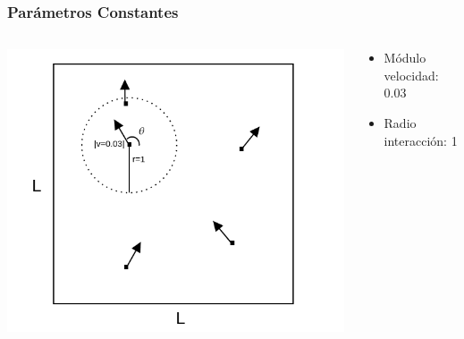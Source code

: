 \begin{frame}
\frametitle{Parámetros Constantes}
\begin{columns}
    \begin{column}{0.4\textwidth}
      \begin{center}
        \includegraphics[width=\textwidth]{images/model-values.png} %
      \end{center}
    \end{column}
    \begin{column}{0.6\textwidth}
        \footnotesize
        \begin{itemize}
    \item Módulo velocidad: 0.03
    \item Radio interacción: 1
\end{itemize}
    \end{column}
\end{columns}

\end{frame}

